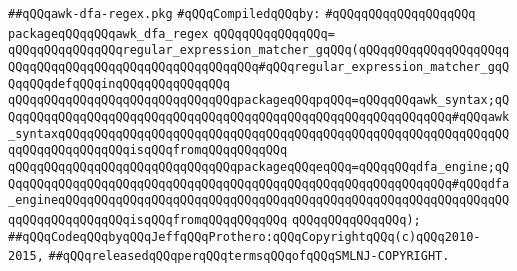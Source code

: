 \label{src/lib/regex/awk-dfa-regex.pkg}
\verb|##qQQqawk-dfa-regex.pkg|\newline
\newline
\verb|#qQQqCompiledqQQqby:|\newline
\verb|#qQQqqQQqqQQqqQQqqQQq|\newline
\newline
\verb|packageqQQqqQQqawk_dfa_regex|\newline
\verb|qQQqqQQqqQQqqQQq=|\newline
\verb|qQQqqQQqqQQqqQQqregular_expression_matcher_gqQQq(qQQqqQQqqQQqqQQqqQQqqQQqqQQqqQQqqQQqqQQqqQQqqQQqqQQqqQQq#qQQqregular_expression_matcher_gqQQqqQQqdefqQQqinqQQqqQQqqQQqqQQq|\newline
\verb|qQQqqQQqqQQqqQQqqQQqqQQqqQQqqQQqpackageqQQqpqQQq=qQQqqQQqawk_syntax;qQQqqQQqqQQqqQQqqQQqqQQqqQQqqQQqqQQqqQQqqQQqqQQqqQQqqQQqqQQqqQQq#qQQqawk_syntaxqQQqqQQqqQQqqQQqqQQqqQQqqQQqqQQqqQQqqQQqqQQqqQQqqQQqqQQqqQQqqQQqqQQqqQQqqQQqqQQqisqQQqfromqQQqqQQqqQQq|\newline
\verb|qQQqqQQqqQQqqQQqqQQqqQQqqQQqqQQqpackageqQQqeqQQq=qQQqqQQqdfa_engine;qQQqqQQqqQQqqQQqqQQqqQQqqQQqqQQqqQQqqQQqqQQqqQQqqQQqqQQqqQQqqQQq#qQQqdfa_engineqQQqqQQqqQQqqQQqqQQqqQQqqQQqqQQqqQQqqQQqqQQqqQQqqQQqqQQqqQQqqQQqqQQqqQQqqQQqqQQqisqQQqfromqQQqqQQqqQQq|\newline
\verb|qQQqqQQqqQQqqQQq);|\newline
\newline
\newline
\newline
\verb|##qQQqCodeqQQqbyqQQqJeffqQQqProthero:qQQqCopyrightqQQq(c)qQQq2010-2015,|\newline
\verb|##qQQqreleasedqQQqperqQQqtermsqQQqofqQQqSMLNJ-COPYRIGHT.|\newline


